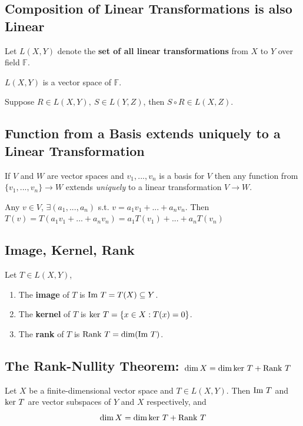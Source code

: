 \documentclass[11pt]{elegantbook}
\begin{document}
\subsection{Composition of Linear Transformations is also Linear}
Let $L(X, Y)$ denote the \textbf{set of all linear transformations} from $X$ to $Y$ over field $\mathbb{F}$.
\begin{theorem}
    $L(X,Y)$ is a vector space of $\mathbb{F}$.
\end{theorem}

\begin{proposition}
    Suppose $R\in L(X,Y),\ S\in L(Y,Z)$, then $S\circ R\in L(X,Z)$.
\end{proposition}

\subsection{Function from a Basis extends uniquely to a Linear Transformation}
\begin{proposition}[Proposition 2.4.15.]
    If $V$ and $W$ are vector spaces and $v_1,...,v_n$ is a basis for $V$ then any function
    from $\{v_1,...,v_n\}\rightarrow W$ extends \textit{uniquely} to a linear transformation $V \rightarrow W$.
\end{proposition}
Any $v\in V$, $\exists (a_1,...,a_n)$ s.t. $v=a_1 v_1+...+a_n v_n$. Then $T(v)=T(a_1 v_1+...+a_n v_n)=a_1T(v_1)+...+a_nT(v_n)$

\subsection{Image, Kernel, Rank}
\begin{definition}
    \normalfont
    Let $T\in L(X,Y)$,
    \begin{enumerate}[$\circ$]
        \item The \textbf{image} of $T$ is $\textnormal{Im }T= T(X)\subseteq Y$.
        \item The \textbf{kernel} of $T$ is $\textnormal{ker }T=\{x\in X:T(x)=0\}$.
        \item The \textbf{rank} of $T$ is $\textnormal{Rank }T=\dim(\textnormal{Im }T)$.
    \end{enumerate}
\end{definition}


\subsection{The Rank-Nullity Theorem: $\dim X=\dim\textnormal{ker }T+\textnormal{Rank }T$}
\begin{theorem}
    Let $X$ be a finite-dimensional vector space and $T \in L(X, Y)$. Then $\textnormal{Im }T$ and $\textnormal{ker }T$ are vector subspaces of $Y$ and $X$ respectively, and
    $$\dim X=\dim\textnormal{ker }T+\textnormal{Rank }T$$
\end{theorem}
\end{document}

